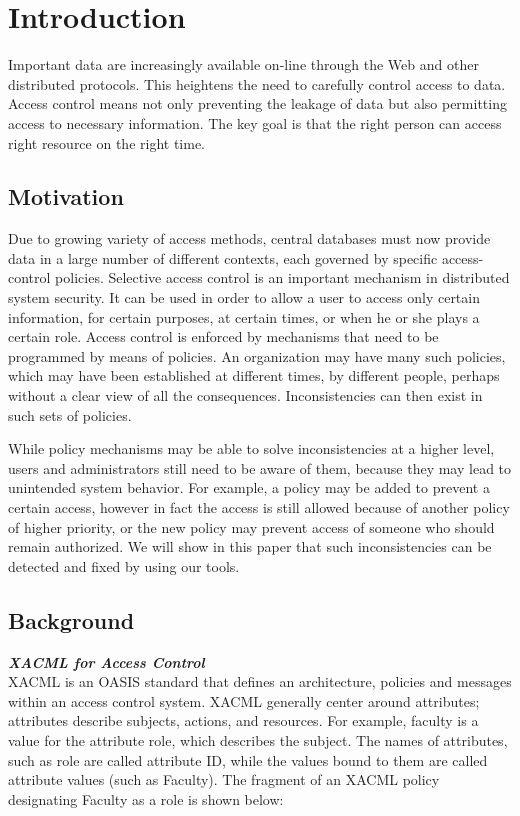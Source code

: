 \documentclass{acm_proc_article-sp}
\begin{document}

\section{Introduction}

Important data are increasingly available on-line through the Web and other distributed protocols. This heightens the need to carefully control access to data. Access control means not only preventing the leakage of data but also permitting access to necessary information. The key goal is that the right person can access right resource on the right time.

\subsection{Motivation}

Due to growing variety of access methods, central databases must now provide data in a
large number of different contexts, each governed by specific access-control policies. Selective access control is an important mechanism in distributed system security. It can be used in order to allow a user to access only certain information, for certain purposes, at certain times, or when he or she plays a certain role. Access control is enforced by mechanisms that need to be programmed by means of policies. An organization may have many such policies, which may have been established at different times, by different people, perhaps without a clear view of all the consequences. Inconsistencies can then exist in such sets of policies. 

While policy mechanisms may be able to solve inconsistencies at a higher level, users and administrators still need to be aware of them, because they may lead to unintended system behavior. For example, a policy may be added to prevent a certain access, however in fact the access is still allowed because of another policy of higher priority, or the new policy may prevent access of someone who should remain authorized. We will show in this paper that such inconsistencies can be detected and fixed by using our tools.

\subsection{Background}


\textbf{\emph{XACML for Access Control}}\\
XACML is an OASIS standard that defines an architecture, policies and messages within an access control system. XACML generally center around attributes; attributes describe subjects, actions, and resources. For example, faculty is a value for the attribute role, which describes the subject. The names of attributes, such as role are called attribute ID, while the values bound
to them are called attribute values  (such as Faculty). The fragment of an XACML policy designating Faculty as a role is shown below:\\
\end{document}

